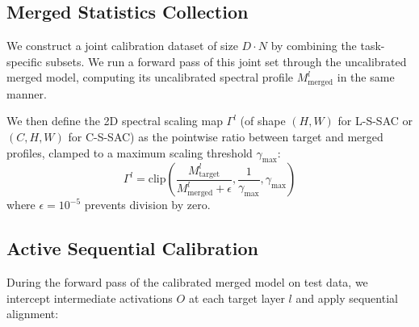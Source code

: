 \documentclass{article}
\theoremstyle{plain}
\theoremstyle{definition}
\theoremstyle{remark}
\begin{document}
\subsection{Merged Statistics Collection}
We construct a joint calibration dataset of size $D \cdot N$ by combining the task-specific subsets. We run a forward pass of this joint set through the uncalibrated merged model, computing its uncalibrated spectral profile $M^l_{\text{merged}}$ in the same manner.

We then define the 2D spectral scaling map $\Gamma^l$ (of shape $(H, W)$ for L-S-SAC or $(C, H, W)$ for C-S-SAC) as the pointwise ratio between target and merged profiles, clamped to a maximum scaling threshold $\gamma_{\text{max}}$:
\begin{equation}
    \Gamma^l = \text{clip}\left( \frac{M^l_{\text{target}}}{M^l_{\text{merged}} + \epsilon}, \frac{1}{\gamma_{\text{max}}}, \gamma_{\text{max}} \right)
\end{equation}
where $\epsilon = 10^{-5}$ prevents division by zero.

\subsection{Active Sequential Calibration}
During the forward pass of the calibrated merged model on test data, we intercept intermediate activations $O$ at each target layer $l$ and apply sequential alignment:
\end{document}
